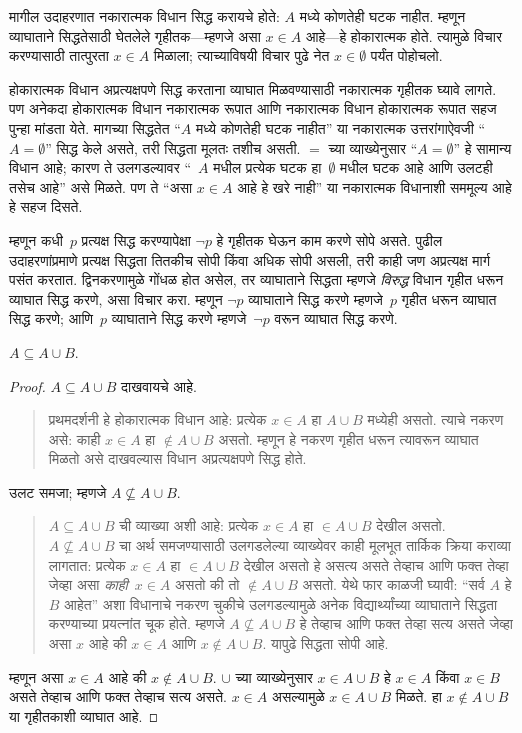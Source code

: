 मागील उदाहरणात नकारात्मक विधान सिद्ध करायचे होते: $A$ मध्ये कोणतेही घटक नाहीत. म्हणून व्याघाताने सिद्धतेसाठी घेतलेले गृहीतक---म्हणजे असा $x \in A$ आहे---हे होकारात्मक होते. त्यामुळे विचार करण्यासाठी तात्पुरता $x \in A$ मिळाला; त्याच्याविषयी विचार पुढे नेत $x \in \emptyset$ पर्यंत पोहोचलो.

होकारात्मक विधान अप्रत्यक्षपणे सिद्ध करताना व्याघात मिळवण्यासाठी नकारात्मक गृहीतक घ्यावे लागते. पण अनेकदा होकारात्मक विधान नकारात्मक रूपात आणि नकारात्मक विधान होकारात्मक रूपात सहज पुन्हा मांडता येते. मागच्या सिद्धतेत “$A$ मध्ये कोणतेही घटक नाहीत” या नकारात्मक उत्तरांगाऐवजी “$A = \emptyset$” सिद्ध केले असते, तरी सिद्धता मूलतः तशीच असती. $=$ च्या व्याख्येनुसार “$A = \emptyset$” हे सामान्य विधान आहे; कारण ते उलगडल्यावर “~$A$ मधील प्रत्येक घटक हा~$\emptyset$ मधील घटक आहे आणि उलटही तसेच आहे” असे मिळते. पण ते “असा $x \in A$ आहे हे खरे नाही” या नकारात्मक विधानाशी सममूल्य आहे हे सहज दिसते.

म्हणून कधी~$p$ प्रत्यक्ष सिद्ध करण्यापेक्षा $\lnot p$ हे गृहीतक घेऊन काम करणे सोपे असते. पुढील उदाहरणांप्रमाणे प्रत्यक्ष सिद्धता तितकीच सोपी किंवा अधिक सोपी असली, तरी काही जण अप्रत्यक्ष मार्ग पसंत करतात. द्विनकरणामुळे गोंधळ होत असेल, तर व्याघाताने सिद्धता म्हणजे \emph{विरुद्ध} विधान गृहीत धरून व्याघात सिद्ध करणे, असा विचार करा. म्हणून $\lnot p$ व्याघाताने सिद्ध करणे म्हणजे~$p$ गृहीत धरून व्याघात सिद्ध करणे; आणि~$p$ व्याघाताने सिद्ध करणे म्हणजे~$\lnot p$ वरून व्याघात सिद्ध करणे.

\begin{prop}
$A \subseteq A \cup B$.
\end{prop}

\begin{proof}
$A \subseteq A \cup B$ दाखवायचे आहे.
\begin{quote}
प्रथमदर्शनी हे होकारात्मक विधान आहे: प्रत्येक $x \in A$ हा $A \cup B$ मध्येही असतो. त्याचे नकरण असे: काही $x \in A$ हा $\notin A \cup B$ असतो. म्हणून हे नकरण गृहीत धरून त्यावरून व्याघात मिळतो असे दाखवल्यास विधान अप्रत्यक्षपणे सिद्ध होते.
\end{quote}
उलट समजा; म्हणजे $A \nsubseteq A \cup B$.
\begin{quote}
$A \subseteq A \cup B$ ची व्याख्या अशी आहे: प्रत्येक $x \in A$ हा $\in A \cup B$ देखील असतो. $A \nsubseteq A \cup B$ चा अर्थ समजण्यासाठी उलगडलेल्या व्याख्येवर काही मूलभूत तार्किक क्रिया कराव्या लागतात: प्रत्येक $x \in A$ हा $\in A \cup B$ देखील असतो हे असत्य असते तेव्हाच आणि फक्त तेव्हा जेव्हा असा \emph{काही}~$x \in A$ असतो की तो $\notin A \cup B$ असतो. येथे फार काळजी घ्यावी: “सर्व $A$ हे $B$ आहेत” अशा विधानाचे नकरण चुकीचे उलगडल्यामुळे अनेक विद्यार्थ्यांच्या व्याघाताने सिद्धता करण्याच्या प्रयत्नांत चूक होते. म्हणजे $A \nsubseteq A \cup B$ हे तेव्हाच आणि फक्त तेव्हा सत्य असते जेव्हा असा $x$ आहे की $x \in A$ आणि $x \notin A \cup B$. यापुढे सिद्धता सोपी आहे.
\end{quote}
म्हणून असा $x \in A$ आहे की $x \notin A \cup B$. $\cup$ च्या व्याख्येनुसार $x \in A \cup B$ हे $x \in A$ किंवा $x \in B$ असते तेव्हाच आणि फक्त तेव्हाच सत्य असते. $x \in A$ असल्यामुळे $x \in A \cup B$ मिळते. हा $x \notin A \cup B$ या गृहीतकाशी व्याघात आहे.
\end{proof}

